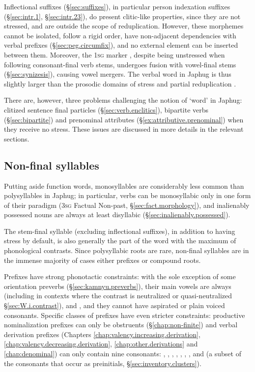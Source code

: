 Inflectional suffixes (§\ref{sec:suffixes}), in particular person indexation suffixes (§\ref{sec:intr.1}, §\ref{sec:intr.23}), do present clitic-like properties, since they are not stressed, and are outside the scope of reduplication. However, these morphemes cannot be isolated, follow a rigid order, have non-adjacent dependencies with verbal prefixes (§\ref{sec:peg.circumfix}), and no external element can be inserted between them. Moreover, the \textsc{1sg} marker , despite being unstressed when following consonant-final verb stems, undergoes fusion with vowel-final stems (§\ref{sec:synizesis}), causing vowel mergers. The verbal word in Japhug is thus slightly larger than the prosodic domains of stress and partial reduplication \citep{schiering10prosodic}.

There are, however, three problems challenging the notion of `word' in Japhug: clitized sentence final particles (§\ref{sec:verb.enclitics}), bipartite verbs (§\ref{sec:bipartite}) and  prenominal attributes (§\ref{ex:attributive.prenominal}) when they receive no stress. These issues are discussed in more details in the relevant sections. 

\subsection{Non-final syllables} \label{sec:non.final.syllable}
Putting aside function words, monosyllables are considerably less common than polysyllables in Japhug; in particular, verbs can be monosyllabic only in one form of their paradigm (\textsc{3sg} Factual Non-past, §\ref{sec:fact.morphology}), and inalienably possessed nouns are always at least disyllabic (§\ref{sec:inalienably.possessed}).

The stem-final syllable (excluding inflectional suffixes), in addition to having stress by default, is also generally the part of the word with the maximum of phonological contrasts. Since polysyllabic roots are rare, non-final syllables are in the immense majority of cases either prefixes or compound roots.

Prefixes have strong phonotactic constraints: with the sole exception of some orientation preverbs (§\ref{sec:kamnyu.preverbs}), their main vowels are always  (including  in contexts where the contrast is neutralized or quasi-neutralized §\ref{sec:W.i.contrast}),  and , and they cannot have aspirated or plain voiced consonants. Specific classes of prefixes have even stricter constraints: productive nominalization prefixes can only be obstruents (§\ref{chap:non-finite}) and  verbal derivation prefixes (Chapters \ref{chap:valency.increasing.derivation}, \ref{chap:valency.decreasing.derivation}, \ref{chap:other.derivations} and \ref{chap:denominal}) can only contain nine consonants: , , , ,  , ,  ,  and  (a subset of the consonants that occur as preinitials, §\ref{sec:inventory.clusters}).

